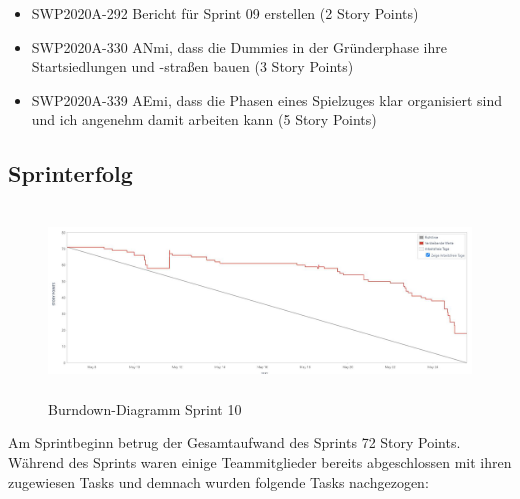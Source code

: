 \documentclass[12pt,a4paper, oneside]{article}
\begin{document}
\begin{itemize}
        \item SWP2020A-292 Bericht für Sprint 09 erstellen (2 Story Points)

        \item SWP2020A-330 ANmi, dass die Dummies in der Gründerphase ihre Startsiedlungen und -straßen bauen (3 Story Points)

        \item SWP2020A-339 AEmi, dass die Phasen eines Spielzuges klar organisiert sind und ich angenehm damit arbeiten kann (5 Story Points)


    \end{itemize}

    \newpage
    \subsection{Sprinterfolg}
    \begin{figure}[h]
        \centering
        \includegraphics[width=\textwidth, height=5cm]{../img/sprint_10/Burndown-Sprint10.png}
        \caption{Burndown-Diagramm Sprint 10}
        \label{fig: Burndown-Sprint 10}
    \end{figure}

    \noindent
    Am Sprintbeginn betrug der Gesamtaufwand des Sprints 72 Story Points. Während des Sprints waren einige Teammitglieder bereits abgeschlossen mit ihren zugewiesen Tasks und demnach wurden folgende Tasks nachgezogen:
\end{document}
